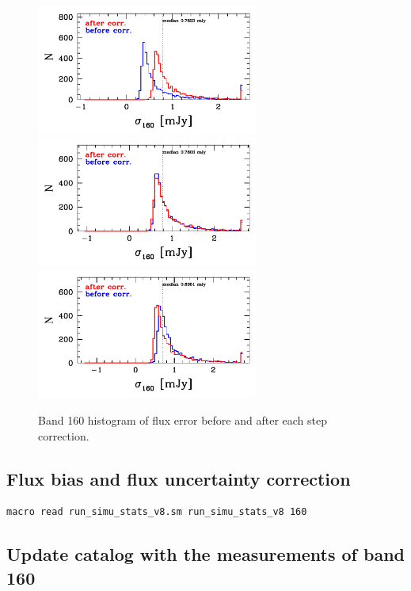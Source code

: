 \documentclass[11pt,a4paper]{article}
\begin{document}
\begin{figure}[H]
	\caption{
		Band 160 histogram of flux error before and after each step correction. 
	}
	\includegraphics[width=0.65\textwidth]{galsim_160_hist_uncertainty_1}
	\includegraphics[width=0.65\textwidth]{galsim_160_hist_uncertainty_2}
	\includegraphics[width=0.65\textwidth]{galsim_160_hist_uncertainty_3}
\end{figure}


\subsection{Flux bias and flux uncertainty correction}
\label{Band160_dfcorr}

\begin{lstlisting}[language=bash]
macro read run_simu_stats_v8.sm run_simu_stats_v8 160
\end{lstlisting}


\subsection{Update catalog with the measurements of band 160}
\end{document}
